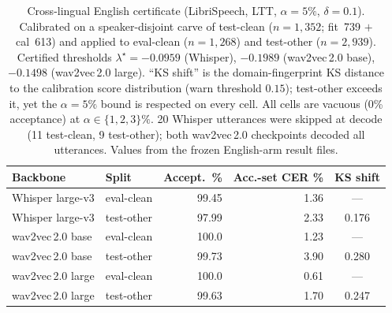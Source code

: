 \documentclass[11pt]{article}
\begin{document}

\begin{table}[t]
  \centering
  \caption{Cross-lingual English certificate (LibriSpeech, LTT, $\alpha=5\%$, $\delta=0.1$).
  Calibrated on a speaker-disjoint carve of test-clean ($n=1{,}352$; fit~739 $+$ cal~613)
  and applied to eval-clean ($n=1{,}268$) and test-other ($n=2{,}939$). Certified thresholds
  $\lambda^\star=-0.0959$ (Whisper), $-0.1989$ (wav2vec\,2.0 base), $-0.1498$
  (wav2vec\,2.0 large). ``KS shift'' is the
  domain-fingerprint KS distance to the calibration score distribution (warn threshold
  $0.15$); test-other exceeds it, yet the $\alpha=5\%$ bound is respected on every cell.
  All cells are vacuous (0\% acceptance) at $\alpha\in\{1,2,3\}\%$. 20 Whisper utterances
  were skipped at decode (11 test-clean, 9 test-other); both wav2vec\,2.0 checkpoints
  decoded all utterances. Values from the frozen
  English-arm result files.}
  \label{tab:english}
  \begin{tabular}{llrrc}
    \toprule
    Backbone & Split & Accept.\ \% & Acc.-set CER \% & KS shift \\
    \midrule
    Whisper large-v3   & eval-clean & 99.45 & 1.36 & --- \\
    Whisper large-v3   & test-other & 97.99 & 2.33 & 0.176 \\
    wav2vec\,2.0 base  & eval-clean & 100.0 & 1.23 & --- \\
    wav2vec\,2.0 base  & test-other & 99.73 & 3.90 & 0.280 \\
    wav2vec\,2.0 large & eval-clean & 100.0 & 0.61 & --- \\
    wav2vec\,2.0 large & test-other & 99.63 & 1.70 & 0.247 \\
    \bottomrule
  \end{tabular}
\end{table}
\end{document}
